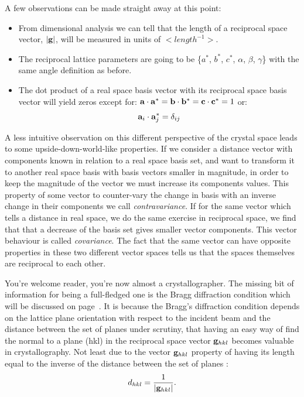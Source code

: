 A few observations can be made straight away at this point:
\begin{itemize}
\item From dimensional analysis we can tell that the length of a reciprocal space vector, $|\vb{g}|$, will be measured in units of $<length^{-1}>$.
\item The reciprocal lattice parameters are going to be \{$a^*$, $b^*$, $c^*$, $\alpha$, $\beta$, $\gamma$\} with the same angle definition as before.
\item The dot product of a real space basis vector with its reciprocal space basis vector will yield zeros except for: $\vb{a}\cdot\vb{a}^*=\vb{b}\cdot\vb{b}^*=\vb{c}\cdot\vb{c}^*=1$ or:
\begin{equation}
\label{eq:adotastar}
\vb{a}_i\cdot\vb{a}^*_j=\delta_{ij}
\end{equation}

\end{itemize}


A less intuitive observation on this different perspective of the crystal space leads to some upside-down-world-like properties. If we consider a distance vector with components known in relation to a real space basis set, and want to transform it to another real space basis with basis vectors smaller in magnitude, in order to keep the magnitude of the vector we must increase its components values. This property of some vector to counter-vary the change in basis with an inverse change in their components we call \textit{contravariance}. If  for the same vector which tells a distance in real space, we do the same exercise in reciprocal space, we find that that a decrease of the basis set gives smaller vector components. This vector behaviour is called \textit{covariance}. The fact that the same vector can have opposite properties in these two different vector spaces tells us that the spaces themselves are reciprocal to each other.

You're welcome reader, you're now almost a crystallographer. The missing bit of information for being a full-fledged one is the Bragg diffraction condition which will be discussed on page~\pageref{Sec:Bragg}. It is because the Bragg's diffraction condition depends on the lattice plane orientation with respect to the incident beam and the distance between the set of planes under scrutiny, that having an easy way of find the normal to a plane \hkl(hkl) in the reciprocal space vector $\vb{g}_{hkl}$ becomes valuable in crystallography. Not least due to the vector $\vb{g}_{hkl}$ property of having its length equal to the inverse of the distance between the set of planes :
\begin{equation}
\label{eq:dhkl}
d_{hkl} = \frac{1}{|\vb{g}_{hkl}|}.
\end{equation}



